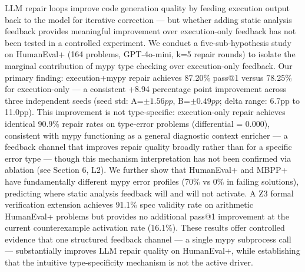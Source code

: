 
LLM repair loops improve code generation quality by feeding execution output back to the model for iterative correction --- but whether adding static analysis feedback provides meaningful improvement over execution-only feedback has not been tested in a controlled experiment. We conduct a five-sub-hypothesis study on HumanEval+ (164 problems, GPT-4o-mini, k=5 repair rounds) to isolate the marginal contribution of mypy type checking over execution-only feedback. Our primary finding: execution+mypy repair achieves 87.20\% pass@1 versus 78.25\% for execution-only --- a consistent +8.94 percentage point improvement across three independent seeds (seed std: A=$\pm 1.56pp$, B=$\pm 0.49pp$; delta range: 6.7pp to 11.0pp). This improvement is not type-specific: execution-only repair achieves identical 90.9\% repair rates on type-error problems (differential = 0.000), consistent with mypy functioning as a general diagnostic context enricher --- a feedback channel that improves repair quality broadly rather than for a specific error type --- though this mechanism interpretation has not been confirmed via ablation (see Section 6, L2). We further show that HumanEval+ and MBPP+ have fundamentally different mypy error profiles (70\% vs 0\% in failing solutions), predicting where static analysis feedback will and will not activate. A Z3 formal verification extension achieves 91.1\% spec validity rate on arithmetic HumanEval+ problems but provides no additional pass@1 improvement at the current counterexample activation rate (16.1\%). These results offer controlled evidence that one structured feedback channel --- a single mypy subprocess call --- substantially improves LLM repair quality on HumanEval+, while establishing that the intuitive type-specificity mechanism is not the active driver.

